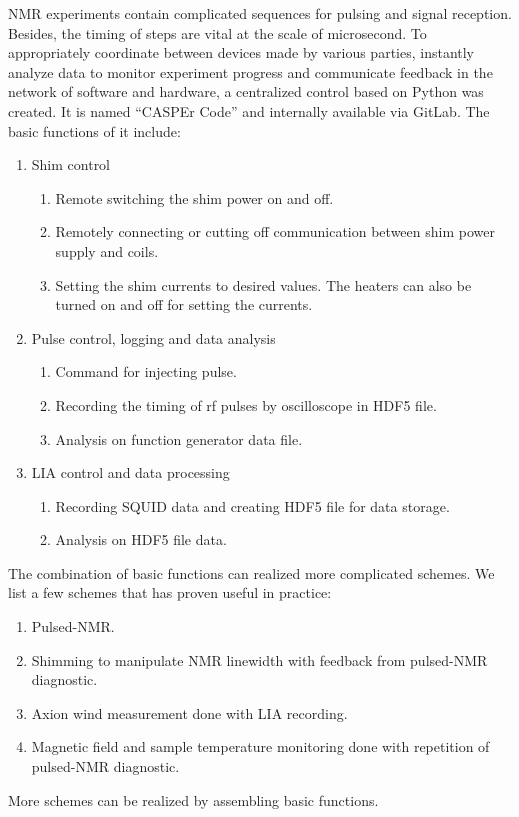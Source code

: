 NMR experiments contain complicated sequences for pulsing and signal reception. Besides, the timing of steps are vital at the scale of microsecond. To appropriately coordinate between devices made by various parties, instantly analyze data to monitor experiment progress and communicate feedback in the network of software and hardware, a centralized control based on Python was created. It is named ``CASPEr Code'' and internally available via GitLab. The basic functions of it include:
\begin{enumerate}
    \item Shim control
    \begin{enumerate}
        \item Remote switching the shim power on and off. 
        \item Remotely connecting or cutting off communication between shim power supply and coils. 
        \item Setting the shim currents to desired values. The heaters can also be turned on and off for setting the currents. 
    \end{enumerate}
    \item Pulse control, logging and data analysis
    \begin{enumerate}
        \item Command for injecting pulse. 
        \item Recording the timing of rf pulses by oscilloscope in HDF5 file. 
        \item Analysis on function generator data file. 
    \end{enumerate}
    \item LIA control and data processing
    \begin{enumerate}
        \item Recording SQUID data and creating HDF5 file for data storage. 
        \item Analysis on HDF5 file data. 
    \end{enumerate}
\end{enumerate}

The combination of basic functions can realized more complicated schemes. We list a few schemes that has proven useful in practice:
\begin{enumerate}
    \item Pulsed-NMR. 
    \item Shimming to manipulate NMR linewidth with feedback from pulsed-NMR diagnostic. 
    \item Axion wind measurement done with LIA recording. 
    \item Magnetic field and sample temperature monitoring done with repetition of pulsed-NMR diagnostic. 
\end{enumerate}
More schemes can be realized by assembling basic functions. 

